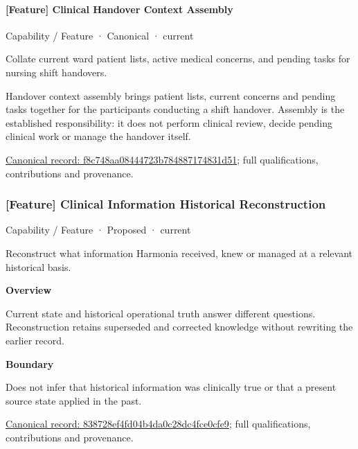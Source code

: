 \paragraph{[Feature] Clinical Handover Context Assembly}

\label{element:f8c748aa08444723b784887174831d51}
{\small Capability / Feature · Canonical · current}\par

Collate current ward patient lists, active medical concerns, and pending tasks for nursing shift handovers.



Handover context assembly brings patient lists, current concerns and pending tasks together for the participants conducting a shift handover. Assembly is the established responsibility: it does not perform clinical review, decide pending clinical work or manage the handover itself.


{\footnotesize \href{../../../../continuum/strategy/capability/feature/f8c748aa08444723b784887174831d51.md}{Canonical record: f8c748aa08444723b784887174831d51}; full qualifications, contributions and provenance.}\par
\subsubsection{[Feature] Clinical Information Historical Reconstruction}

\label{element:838728ef4fd04b4da0c28dc4fce0cfe9}
{\small Capability / Feature · Proposed · current}\par

Reconstruct what information Harmonia received, knew or managed at a relevant historical basis.



\textbf{Overview}



Current state and historical operational truth answer different questions. Reconstruction retains superseded and corrected knowledge without rewriting the earlier record.



\textbf{Boundary}



Does not infer that historical information was clinically true or that a present source state applied in the past.


{\footnotesize \href{../../../../continuum/strategy/capability/feature/838728ef4fd04b4da0c28dc4fce0cfe9.md}{Canonical record: 838728ef4fd04b4da0c28dc4fce0cfe9}; full qualifications, contributions and provenance.}\par
